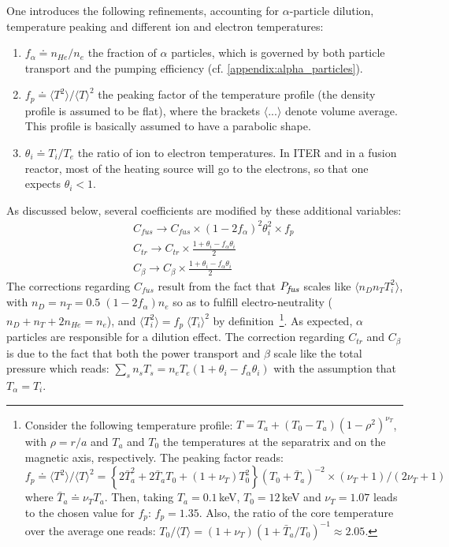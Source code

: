 \documentclass[12pt]{iopart}
\newcommand{\Pfus}{{P_{\textrm{\it\footnotesize fus}}}}
\begin{document}
One introduces the following refinements, accounting for $\alpha$-particle dilution, temperature peaking and different ion and electron temperatures:
\begin{enumerate}
	\item $f_\alpha \doteq n_{He}/n_e$ the fraction of $\alpha$ particles, which is governed by both particle transport and the pumping efficiency (cf. \ref{appendix:alpha_particles}).
	\item $f_p \doteq \langle T^2 \rangle / \langle T \rangle^2$ the peaking factor of the temperature profile (the density profile is assumed to be flat), where the brackets $\langle ...\rangle$ denote volume average. This profile is basically assumed to have a parabolic shape. 
	\item $\theta_i \doteq T_i/T_e$ the ratio of ion to electron temperatures. In ITER and in a fusion reactor, most of the heating source will go to the electrons, so that one expects $\theta_i<1$.
\end{enumerate}
As discussed below, several coefficients are modified by these additional variables:
\begin{eqnarray*}
	&& C_{fus} \to C_{fus} \times (1-2f_\alpha)^2\theta_i^2 \times f_p \\
	&& C_{tr} \to C_{tr} \times \frac{1+\theta_i - f_\alpha\theta_i}{2}  \\
	&& C_\beta \to C_\beta \times \frac{1+\theta_i - f_\alpha\theta_i}{2}
\end{eqnarray*}
The corrections regarding $C_{fus}$ result from the fact that $\Pfus$ scales like $\langle n_Dn_TT_i^2 \rangle$, with $n_D = n_T = 0.5\; (1-2f_\alpha)n_e$ so as to fulfill electro-neutrality ($n_D+n_T+2n_{He}=n_e$), and $\langle T_i^2 \rangle = f_p\; \langle T_i \rangle^2$ by definition~\footnote{Consider the following temperature profile: $T = T_a+ (T_0-T_a) \left(1-\rho^2\right)^{\nu_T}$, with $\rho=r/a$ and $T_a$ and $T_0$ the temperatures at the separatrix and on the magnetic axis, respectively. The peaking factor reads: $f_p \doteq \langle T^2 \rangle / \langle T \rangle^2 = \left\{  2\bar T_a^2+2\bar T_aT_0+(1+\nu_T)T_0^2\right\}(T_0+\bar T_a)^{-2} \times (\nu_T+1)/(2\nu_T+1)$ where $\bar T_a \doteq \nu_TT_a$. Then, taking $T_a=0.1\,$keV, $T_0=12\,$keV and $\nu_T=1.07$ leads to the chosen value for $f_p$: $f_p=1.35$. Also, the ratio of the core temperature over the average one reads: $T_0/ \langle T \rangle = (1+\nu_T)(1+\bar T_a/T_0)^{-1} \approx 2.05$.}. As expected, $\alpha$ particles are responsible for a dilution effect. The correction regarding $C_{tr}$ and $C_\beta$ is due to the fact that both the power transport and $\beta$ scale like the total pressure which reads: $\sum_s n_sT_s = n_eT_e (1+\theta_i- f_\alpha \theta_i)$ with the assumption that $T_\alpha=T_i$.
\end{document}
